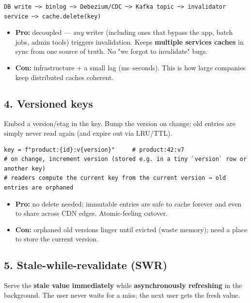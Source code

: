 \documentclass[11pt]{article}
\providecommand{\tightlist}{\setlength{\itemsep}{1pt}\setlength{\parskip}{0pt}}
\begin{document}
\setcodelang{}

\begin{verbatim}
DB write ─> binlog ─> Debezium/CDC ─> Kafka topic ─> invalidator service ─> cache.delete(key)
\end{verbatim}

\begin{itemize}
\tightlist
\item
  \textbf{Pro:} decoupled --- \emph{any} writer (including ones that bypass the app, batch jobs, admin tools) triggers invalidation. Keeps \textbf{multiple services\textquotesingle{} caches} in sync from one source of truth. No "we forgot to invalidate" bugs.
\item
  \textbf{Con:} infrastructure + a small lag (ms--seconds). This is how large companies keep distributed caches coherent.
\end{itemize}

\subsection{4. Versioned keys}\label{4-versioned-keys}

Embed a version/etag in the key. Bump the version on change; old entries are simply never read again (and expire out via LRU/TTL).

\setcodelang{}

\begin{verbatim}
key = f"product:{id}:v{version}"     # product:42:v7
# on change, increment version (stored e.g. in a tiny `version` row or another key)
# readers compute the current key from the current version → old entries are orphaned
\end{verbatim}

\begin{itemize}
\tightlist
\item
  \textbf{Pro:} no delete needed; immutable entries are safe to cache forever and even to share across CDN edges. Atomic-feeling cutover.
\item
  \textbf{Con:} orphaned old versions linger until evicted (waste memory); need a place to store the current version.
\end{itemize}

\subsection{5. Stale-while-revalidate (SWR)}\label{5-stale-while-revalidate-swr}

Serve the \textbf{stale value immediately} while \textbf{asynchronously refreshing} in the background. The user never waits for a miss; the next user gets the fresh value.
\end{document}
